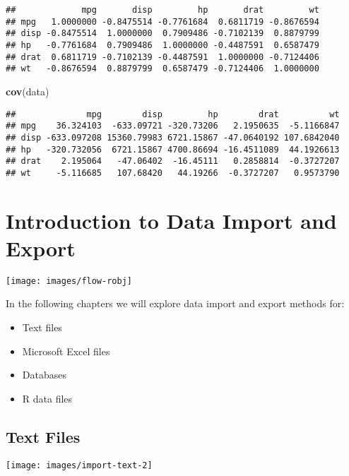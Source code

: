 \documentclass[]{book}
\newenvironment{Shaded}{\begin{snugshade}}{\end{snugshade}}
\newcommand{\KeywordTok}[1]{\textcolor[rgb]{0.13,0.29,0.53}{\textbf{{#1}}}}
\newcommand{\NormalTok}[1]{{#1}}
\providecommand{\tightlist}{%
  \setlength{\itemsep}{0pt}\setlength{\parskip}{0pt}}
\def\tightlist{}
\begin{document}
\begin{verbatim}
##             mpg       disp         hp       drat         wt
## mpg   1.0000000 -0.8475514 -0.7761684  0.6811719 -0.8676594
## disp -0.8475514  1.0000000  0.7909486 -0.7102139  0.8879799
## hp   -0.7761684  0.7909486  1.0000000 -0.4487591  0.6587479
## drat  0.6811719 -0.7102139 -0.4487591  1.0000000 -0.7124406
## wt   -0.8676594  0.8879799  0.6587479 -0.7124406  1.0000000
\end{verbatim}

\begin{Shaded}
\begin{Highlighting}[]
\KeywordTok{cov}\NormalTok{(data)}
\end{Highlighting}
\end{Shaded}

\begin{verbatim}
##              mpg        disp         hp        drat          wt
## mpg    36.324103  -633.09721 -320.73206   2.1950635  -5.1166847
## disp -633.097208 15360.79983 6721.15867 -47.0640192 107.6842040
## hp   -320.732056  6721.15867 4700.86694 -16.4511089  44.1926613
## drat    2.195064   -47.06402  -16.45111   0.2858814  -0.3727207
## wt     -5.116685   107.68420   44.19266  -0.3727207   0.9573790
\end{verbatim}

\chapter{Introduction to Data Import and
Export}\label{introduction-to-data-import-and-export}

\texttt{[image: images/flow-robj]}

In the following chapters we will explore data import and export methods
for:

\begin{itemize}
\tightlist
\item
  Text files
\item
  Microsoft Excel files
\item
  Databases
\item
  R data files
\end{itemize}

\section{Text Files}\label{text-files}

\texttt{[image: images/import-text-2]}
\end{document}
